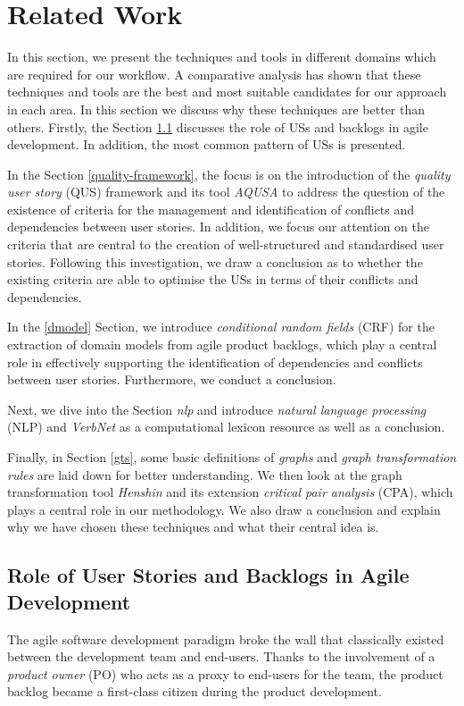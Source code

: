\section{Related Work}\label{related-work}
In this section, we present the techniques and tools in different domains which are required for our workflow. A comparative analysis \cite{nejad2023} has shown that these techniques and tools are the best and most suitable candidates for our approach in each area. In this section we discuss why these techniques are better than others. 
Firstly, the Section \ref{us} discusses the role of USs and backlogs in agile development. In addition, the most common pattern of USs is presented. 

In the Section \ref{quality-framework}, the focus is on the introduction of the \emph{quality user story} (QUS) framework and its tool \emph{AQUSA} to address the question of the existence of criteria for the management and identification of conflicts and dependencies between user stories. In addition, we focus our attention on the criteria that are central to the creation of well-structured and standardised user stories. Following this investigation, we draw a conclusion as to whether the existing criteria are able to optimise the USs in terms of their conflicts and dependencies.

In the \ref{dmodel} Section, we introduce \emph{conditional random fields} (CRF) for the extraction of domain models from agile product backlogs, which play a central role in effectively supporting the identification of dependencies and conflicts between user stories. Furthermore, we conduct a conclusion.

Next, we dive into the Section \emph{nlp} and introduce \emph{natural language processing} (NLP) and \emph{VerbNet} as a computational lexicon resource as well as a conclusion.

Finally, in Section \ref{gts}, some basic definitions of \emph{graphs} and \emph{graph transformation rules} are laid down for better understanding. We then look at the graph transformation tool \emph{Henshin} and its extension \emph{critical pair analysis} (CPA), which plays a central role in our methodology. We also draw a conclusion and explain why we have chosen these techniques and what their central idea is.

\subsection{Role of User Stories and Backlogs in Agile Development}\label{us}
The agile software development paradigm broke the wall that classically existed between the development team and end-users. Thanks to the involvement of a \emph{product owner} (PO) who acts as a proxy to end-users for the team, the product backlog \cite{sedano2019product} became a first-class citizen during the product development. 

